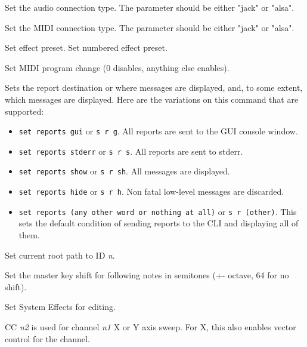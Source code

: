       Set the audio connection type.
      The parameter should be either "jack" or "alsa".

      Set the MIDI connection type.
      The parameter should be either "jack" or "alsa".

      Set effect preset.
      Set numbered effect preset.

      Set MIDI program change (0 disables, anything else enables).

      Sets the report destination or where messages are displayed, and, to some
      extent, which messages are displayed.  Here are the variations on this
      command that are supported:

      \begin{itemize}
         \item \texttt{set reports gui} or \texttt{s r g}.
            All reports are sent to the GUI console window.
         \item \texttt{set reports stderr} or \texttt{s r s}.
            All reports are sent to stderr.
         \item \texttt{set reports show} or \texttt{s r sh}.
            All messages are displayed.
         \item \texttt{set reports hide} or \texttt{s r h}.
            Non fatal low-level messages are discarded.
         \item \texttt{set reports (any other word or nothing at all)} or
            \texttt{s r (other)}.
            This sets the default condition of sending reports to the CLI and
            displaying all of them.
      \end{itemize}

      Set current root path to ID \textsl{n}.

      Set the master key shift for following notes in semitones (+-
      octave, 64 for no shift).

      Set System Effects for editing.

      CC \textsl{n2} is used for channel \textsl{n1} X or Y axis sweep.
      For X, this also enables vector control for the channel.

